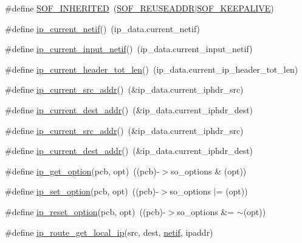 \begin{DoxyCompactItemize}
\item 
\#define \hyperlink{openmote-cc2538_2lwip_2src_2include_2lwip_2ip_8h_ae4bbdf8a2e757d758ec0e1c91b58893f}{S\+O\+F\+\_\+\+I\+N\+H\+E\+R\+I\+T\+ED}~(\hyperlink{openmote-cc2538_2lwip_2src_2include_2lwip_2ip_8h_aa40b3366a7939ec3a60e9a7d239575e2}{S\+O\+F\+\_\+\+R\+E\+U\+S\+E\+A\+D\+DR}$\vert$\hyperlink{openmote-cc2538_2lwip_2src_2include_2lwip_2ip_8h_a1f7f7efb095c77c06af5c5e8ba558d45}{S\+O\+F\+\_\+\+K\+E\+E\+P\+A\+L\+I\+VE})
\item 
\#define \hyperlink{openmote-cc2538_2lwip_2src_2include_2lwip_2ip_8h_aabecef3c7653a9767c79245c44fcab9f}{ip\+\_\+current\+\_\+netif}()~(ip\+\_\+data.\+current\+\_\+netif)
\item 
\#define \hyperlink{openmote-cc2538_2lwip_2src_2include_2lwip_2ip_8h_ae214afa9d3f1b26fc8d538436b8fa3c4}{ip\+\_\+current\+\_\+input\+\_\+netif}()~(ip\+\_\+data.\+current\+\_\+input\+\_\+netif)
\item 
\#define \hyperlink{openmote-cc2538_2lwip_2src_2include_2lwip_2ip_8h_a2ca15ea285a10982294378cd7b8e83e2}{ip\+\_\+current\+\_\+header\+\_\+tot\+\_\+len}()~(ip\+\_\+data.\+current\+\_\+ip\+\_\+header\+\_\+tot\+\_\+len)
\item 
\#define \hyperlink{openmote-cc2538_2lwip_2src_2include_2lwip_2ip_8h_a4e35b7692c228c98e738892f0a215647}{ip\+\_\+current\+\_\+src\+\_\+addr}()~(\&ip\+\_\+data.\+current\+\_\+iphdr\+\_\+src)
\item 
\#define \hyperlink{openmote-cc2538_2lwip_2src_2include_2lwip_2ip_8h_a9135977868017c3deeec86b525e13997}{ip\+\_\+current\+\_\+dest\+\_\+addr}()~(\&ip\+\_\+data.\+current\+\_\+iphdr\+\_\+dest)
\item 
\#define \hyperlink{openmote-cc2538_2lwip_2src_2include_2lwip_2ip_8h_a4e35b7692c228c98e738892f0a215647}{ip\+\_\+current\+\_\+src\+\_\+addr}()~(\&ip\+\_\+data.\+current\+\_\+iphdr\+\_\+src)
\item 
\#define \hyperlink{openmote-cc2538_2lwip_2src_2include_2lwip_2ip_8h_a9135977868017c3deeec86b525e13997}{ip\+\_\+current\+\_\+dest\+\_\+addr}()~(\&ip\+\_\+data.\+current\+\_\+iphdr\+\_\+dest)
\item 
\#define \hyperlink{openmote-cc2538_2lwip_2src_2include_2lwip_2ip_8h_a26e077f52de4a97ff89c02415c084518}{ip\+\_\+get\+\_\+option}(pcb,  opt)~((pcb)-\/$>$so\+\_\+options \& (opt))
\item 
\#define \hyperlink{openmote-cc2538_2lwip_2src_2include_2lwip_2ip_8h_a13f48cf825c7f074dc05bea54e9d6a93}{ip\+\_\+set\+\_\+option}(pcb,  opt)~((pcb)-\/$>$so\+\_\+options $\vert$= (opt))
\item 
\#define \hyperlink{openmote-cc2538_2lwip_2src_2include_2lwip_2ip_8h_a441c63f00c4b0cb69fc34ca6b55307cc}{ip\+\_\+reset\+\_\+option}(pcb,  opt)~((pcb)-\/$>$so\+\_\+options \&= $\sim$(opt))
\item 
\#define \hyperlink{openmote-cc2538_2lwip_2src_2include_2lwip_2ip_8h_ae392fc1ebc42a4b08f73d42c04089be9}{ip\+\_\+route\+\_\+get\+\_\+local\+\_\+ip}(src,  dest,  \hyperlink{structnetif}{netif},  ipaddr)
\end{DoxyCompactItemize}
